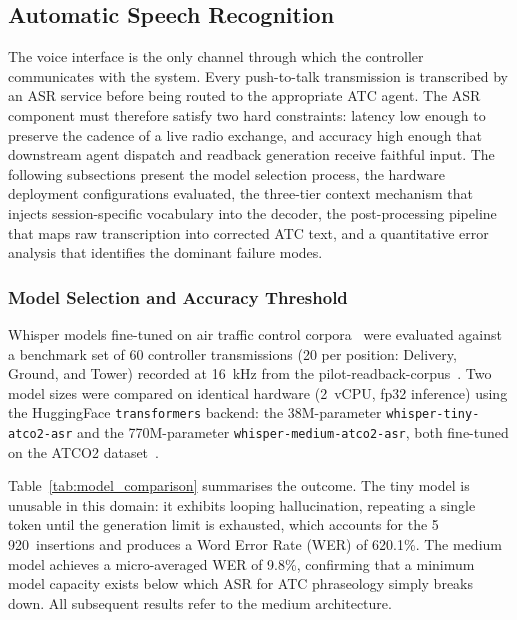 
\subsection{Automatic Speech Recognition}

The voice interface is the only channel through which the controller communicates
with the system. Every push-to-talk transmission is transcribed by an ASR service
before being routed to the appropriate ATC agent. The ASR component must therefore
satisfy two hard constraints: latency low enough to preserve the cadence of a live
radio exchange, and accuracy high enough that downstream agent dispatch and
readback generation receive faithful input. The following subsections present the
model selection process, the hardware deployment configurations evaluated, the
three-tier context mechanism that injects session-specific vocabulary into the
decoder, the post-processing pipeline that maps raw transcription into corrected
ATC text, and a quantitative error analysis that identifies the dominant failure
modes.

\subsubsection{Model Selection and Accuracy Threshold}

Whisper models fine-tuned on air traffic control corpora~\cite{atco2_corpus}
were evaluated against a benchmark set of 60 controller transmissions (20 per
position: Delivery, Ground, and Tower) recorded at 16~kHz from the
pilot-readback-corpus~\cite{SoutoReadbackCorpus2024}. Two model sizes were
compared on identical hardware (2~vCPU, fp32 inference) using the HuggingFace
\texttt{transformers} backend: the 38M-parameter
\texttt{whisper-tiny-atco2-asr} and the 770M-parameter
\texttt{whisper-medium-atco2-asr}, both fine-tuned on the ATCO2
dataset~\cite{zuluaga2023atco2}.

Table~\ref{tab:model_comparison} summarises the outcome. The tiny model is
unusable in this domain: it exhibits looping hallucination, repeating a single
token until the generation limit is exhausted, which accounts for the
5\,920~insertions and produces a Word Error Rate (WER) of 620.1\%. The medium
model achieves a micro-averaged WER of 9.8\%, confirming that a minimum model
capacity exists below which ASR for ATC phraseology simply breaks down. All
subsequent results refer to the medium architecture.

